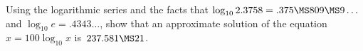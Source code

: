{\Loosen Using the logarithmic series and the facts that $\log_{10} 2.3758 = .375\MS809\MS9\dots$
and $\log_{10} e = .4343\dots$, show that an approximate solution of the equation
$x = 100 \log_{10}x$ is~$237.581\MS21$.} 
